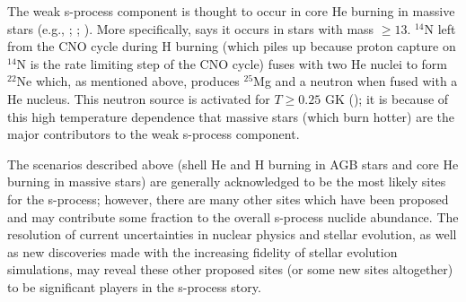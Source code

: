 The weak s-process component is thought to occur in core He burning in
massive stars
(e.g., \citealt{peters1968}; \citealt{couch1974}; \citealt{raiteri1991}).
More specifically, \cite{iliadis2008} says it occurs in stars with mass
$\geq13$\Msol.  $^{14}$N left from the CNO cycle during H burning
(which piles up because proton capture on $^{14}$N is the rate
limiting step of the CNO cycle) fuses with two He nuclei to form
$^{22}$Ne which, as mentioned above, produces $^{25}$Mg and a neutron
when fused with a He nucleus.  This neutron source is activated for
$T \geq 0.25$ GK (\citealt{iliadis2008}); it is because of this high
temperature dependence that massive stars (which burn hotter) are the
major contributors to the weak s-process component.  

The scenarios described above (shell He and H burning in AGB stars and
core He burning in massive stars) are generally acknowledged to be the
most likely sites for the s-process; however, there are many other
sites which have been proposed and may contribute  some fraction to
the 
overall s-process nuclide abundance.  The resolution of current
uncertainties in nuclear physics and stellar evolution, as well as new
discoveries made with the increasing fidelity of stellar evolution
simulations, may reveal these other proposed sites (or some new sites
altogether) to be significant players in the s-process story.

